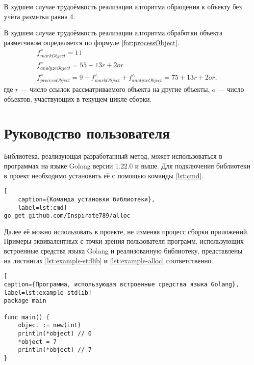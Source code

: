 В худшем случае трудоёмкость реализации алгоритма обращения к объекту без учёта разметки равна 4.

В худшем случае трудоёмкость реализации алгоритма обработки объекта разметчиком определяется по формуле \ref{for:processObject}.
\begin{equation}
	\label{for:processObject}
	\begin{array}{l}
	f_{markObject}^{\wedge} = 11\\
	f_{analyzeObject}^{\wedge} = 55 + 13r + 2or\\
	f_{processObject}^{\wedge} = 9 + f_{markObject}^{\wedge} + f_{analyzeObject}^{\wedge} = 75 + 13r + 2or,
	\end{array}
\end{equation}
где $r$ --- число ссылок рассматриваемого объекта на другие объекты, $o$ --- число объектов, участвующих в текущем цикле сборки.



\section*{Руководство пользователя}

Библиотека, реализующая разработанный метод, может использоваться в программах на языке Golang версии 1.22.0 и выше. Для подключения библиотеки в проект необходимо установить её с помощью команды \ref{lst:cmd}.

\begin{lstlisting}[
	caption={Команда установки библиотеки},
	label=lst:cmd]
go get github.com/Inspirate789/alloc
\end{lstlisting}

Далее её можно использовать в проекте, не изменяя процесс сборки приложений. Примеры эквивалентных с точки зрения пользователя программ, использующих встроенные средства языка Golang и реализованную библиотеку, представлены на листингах \ref{lst:example-stdlib} и \ref{lst:example-alloc} соответственно.

\begin{lstlisting}[
caption={Программа, использующая встроенные средства языка Golang},
label=lst:example-stdlib]
package main

func main() {
	object := new(int)
	println(*object) // 0
	*object = 7
	println(*object) // 7
}
\end{lstlisting}


